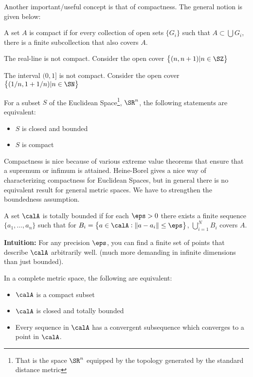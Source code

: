 Another important/useful concept is that of compactness. The general notion is given below:

\begin{definition}
	\label{def:compact}
	A set \(A\) is compact if for every collection of open sets  \(\{G_i\}\) such that \(A\subset \bigcup G_i \), there is a finite subcollection that also covers \(A\).
\end{definition}
\begin{example}[]
	\label{ex:reals}
	The real-line is not compact. Consider the open cover \(\left\{(n,n+1)|n\in\SZ\right\} \)
\end{example}
\begin{example}[]
	\label{ex:halfopen}
	The interval \((0,1]\) is not compact. Consider the open cover  \(\left\{(1/n, 1+1/n)| n\in \SN \right\}\)
\end{example}
\begin{theorem}
	\label{thm:heine-borel}
	For a subset \(S\) of the Euclidean Space\footnote{That is the space \(\SR^n\) equipped by the topology generated by the standard distance metric}, \(\SR^n\), the following statements are equivalent:
	 \begin{itemize}
		\item \(S\) is closed and bounded
		\item  \(S\) is compact
	\end{itemize}
\end{theorem}
Compactness is nice because of various extreme value theorems that ensure that a supremum or infimum is attained. Heine-Borel gives a nice way of characterizing compactness for Euclidean Spaces, but in general there is no equivalent result for general metric spaces. We have to strengthen the boundedness assumption.

\begin{definition}
	\label{def:totally-bounded}
	A set \(\calA\) is totally bounded if for each  \(\eps> 0\) there exists a finite sequence  \(\{a_1,\dots,a_n\}\) such that for \(B_i = \left\{a\in\calA: \left\|a-a_i\right\|\leq \eps\right\}\), \(\bigcup_{i=1}^N B_i\) covers  \(A\).	
\end{definition}

\textbf{Intuition:} For any precision \(\eps\), you can find a finite set of points that describe  \(\calA\) arbitrarily well. (much more demanding in infinite dimensions than just bounded).

\begin{theorem}[]
	In a complete metric space, the following are equivalent:
	\begin{itemize}
		\item \(\calA\) is a compact subset
		\item \(\calA\) is closed and totally bounded 
 		\item Every sequence in \(\calA\) has a convergent subsequence which converges to a point in  \(\calA\).
	\end{itemize}
\end{theorem}

